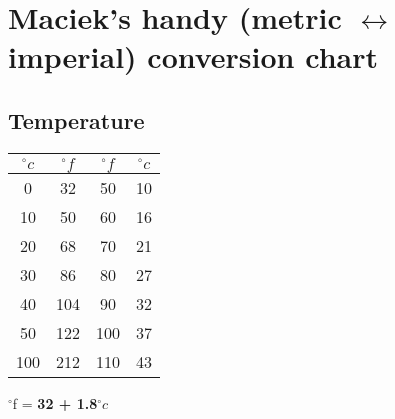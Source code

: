 \documentclass{article}
\begin{document}
\thispagestyle{empty}
\centering

\vspace*{1in}

\section*{Maciek's handy (metric $\leftrightarrow$ imperial) conversion chart}

\vspace*{1cm}


\begin{multicols}{2}












\section*{Temperature}


\begin{multicols}{2}




\begin{tabular}{cc|cc}
	$^{\circ}c$ & $^{\circ}f$ & $^{\circ}f$ & $^{\circ}c$ \\ \hline
	0			&	32		& 50		& 10 	\\
	10			&	50		& 60		& 16 	\\
	20			& 	68		& 70		& 21 	\\
	30			&	86		& 80		& 27 	\\
	40			&	104		& 90		& 32 	\\
	50			&	122		& 100		& 37 	\\
	100			&	212		& 110		& 43 	\\
\end{tabular}

\columnbreak 

\vspace*{.5cm}

$^{\circ}$f = \textbf{32 + 1.8}$^{\circ}c$


\vspace*{1cm}



\end{multicols}


\vspace{1cm}








\end{multicols}
\end{document}
